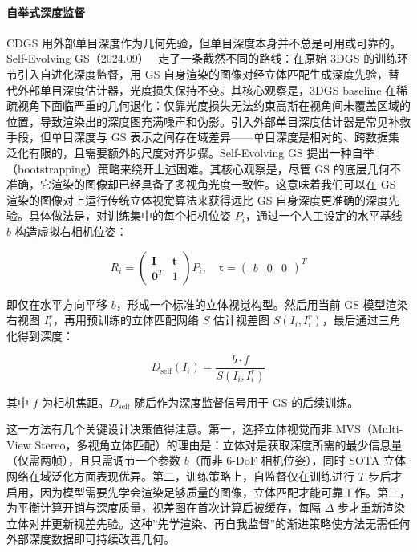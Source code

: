\paragraph{自举式深度监督}

CDGS 用外部单目深度作为几何先验，但单目深度本身并不总是可用或可靠的。Self-Evolving GS（2024.09）~\cite{2409_07456} 走了一条截然不同的路线：在原始 3DGS 的训练环节引入自进化深度监督，用 GS 自身渲染的图像对经立体匹配生成深度先验，替代外部单目深度估计器，光度损失保持不变。其核心观察是，3DGS baseline 在稀疏视角下面临严重的几何退化：仅靠光度损失无法约束高斯在视角间未覆盖区域的位置，导致渲染出的深度图充满噪声和伪影。引入外部单目深度估计器是常见补救手段，但单目深度与 GS 表示之间存在域差异——单目深度是相对的、跨数据集泛化有限的，且需要额外的尺度对齐步骤。Self-Evolving GS 提出一种自举（bootstrapping）策略来绕开上述困难。其核心观察是，尽管 GS 的底层几何不准确，它渲染的图像却已经具备了多视角光度一致性。这意味着我们可以在 GS 渲染的图像对上运行传统立体视觉算法来获得远比 GS 自身深度更准确的深度先验。具体做法是，对训练集中的每个相机位姿 $P_i$，通过一个人工设定的水平基线 $b$ 构造虚拟右相机位姿：

\begin{equation}
R_i = \begin{pmatrix} \mathbf{I} & \mathbf{t} \\ \mathbf{0}^T & 1 \end{pmatrix} P_i, \quad \mathbf{t} = \begin{pmatrix} b & 0 & 0 \end{pmatrix}^T
\end{equation}

即仅在水平方向平移 $b$，形成一个标准的立体视觉构型。然后用当前 GS 模型渲染右视图 $I_i^r$，再用预训练的立体匹配网络 $S$ 估计视差图 $S(I_i, I_i^r)$，最后通过三角化得到深度：

\begin{equation}
D_{\text{self}}(I_i) = \frac{b \cdot f}{S(I_i, I_i^r)}
\end{equation}

其中 $f$ 为相机焦距。$D_{\text{self}}$ 随后作为深度监督信号用于 GS 的后续训练。

这一方法有几个关键设计决策值得注意。第一，选择立体视觉而非 MVS（Multi-View Stereo，多视角立体匹配）的理由是：立体对是获取深度所需的最少信息量（仅需两帧），且只需调节一个参数 $b$（而非 6-DoF 相机位姿），同时 SOTA 立体网络在域泛化方面表现优异。第二，训练策略上，自监督仅在训练进行 $T$ 步后才启用，因为模型需要先学会渲染足够质量的图像，立体匹配才能可靠工作。第三，为平衡计算开销与深度质量，视差图在首次计算后被缓存，每隔 $\Delta$ 步才重新渲染立体对并更新视差先验。这种”先学渲染、再自我监督”的渐进策略使方法无需任何外部深度数据即可持续改善几何。

